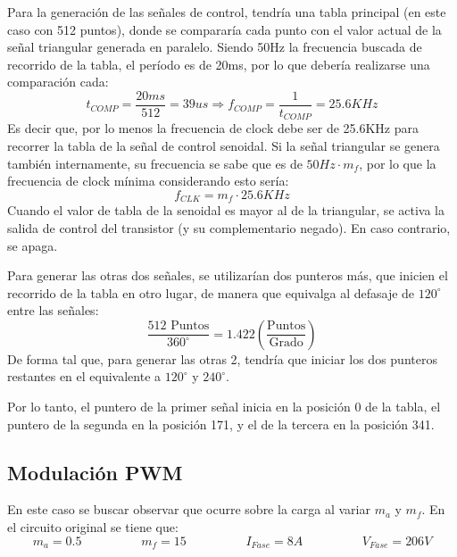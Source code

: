 \documentclass[e4_tp3_main.tex]{subfiles}
\begin{document}
Para la generación de las señales de control, tendría una tabla principal (en este caso con 512 puntos), donde se compararía cada punto con el valor actual de la señal triangular generada en paralelo. Siendo 50Hz la frecuencia buscada de recorrido de la tabla, el período es de 20ms, por lo que debería realizarse una comparación cada:
\[
t_{COMP} = \frac{20ms}{512} = 39us \Longrightarrow f_{COMP} = \frac{1}{t_{COMP}} = 25.6KHz 
\]
Es decir que, por lo menos la frecuencia de clock debe ser de 25.6KHz para recorrer la tabla de la señal de control senoidal. Si la señal triangular se genera también internamente, su frecuencia se sabe que es de $50Hz\cdot m_f$, por lo que la frecuencia de clock mínima considerando esto sería:
\[
f_{CLK} = m_f \cdot 25.6KHz
\]
Cuando el valor de tabla de la senoidal es mayor al de la triangular, se activa la salida de control del transistor (y su complementario negado). En caso contrario, se apaga.\par
Para generar las otras dos señales, se utilizarían dos punteros más, que inicien el recorrido de la tabla en otro lugar, de manera que equivalga al defasaje de $120^{\circ}$ entre las señales:
\[
\frac{512 \textrm{ Puntos}}{360^{\circ}} = 1.422 \left( \frac{\textrm{Puntos}}{\textrm{Grado}} \right)
\]
De forma tal que, para generar las otras 2, tendría que iniciar los dos punteros restantes en el equivalente a $120^{\circ}$ y $240^{\circ}$.\par
Por lo tanto, el puntero de la primer señal inicia en la posición 0 de la tabla, el puntero de la segunda en la posición 171, y el de la tercera en la posición 341. 

\newpage

\subsection{Modulación PWM}

En este caso se buscar observar que ocurre sobre la carga al variar $m_a$ y $m_f$.
En el circuito original se tiene que:
\[
m_a = 0.5 \hspace{2cm} m_f = 15 \hspace{2cm} I_{Fase} = 8A \hspace{2cm} V_{Fase} = 206V
\]
\end{document}
